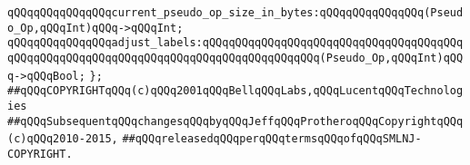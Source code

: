 \verb|qQQqqQQqqQQqqQQqcurrent_pseudo_op_size_in_bytes:qQQqqQQqqQQqqQQq(Pseudo_Op,qQQqInt)qQQq->qQQqInt;|\newline
\verb|qQQqqQQqqQQqqQQqadjust_labels:qQQqqQQqqQQqqQQqqQQqqQQqqQQqqQQqqQQqqQQqqQQqqQQqqQQqqQQqqQQqqQQqqQQqqQQqqQQqqQQqqQQqqQQq(Pseudo_Op,qQQqInt)qQQq->qQQqBool;|\newline
\verb|};|\newline
\newline
\newline
\newline
\newline
\newline
\newline
\newline
\newline
\newline
\verb|##qQQqCOPYRIGHTqQQq(c)qQQq2001qQQqBellqQQqLabs,qQQqLucentqQQqTechnologies|\newline
\verb|##qQQqSubsequentqQQqchangesqQQqbyqQQqJeffqQQqProtheroqQQqCopyrightqQQq(c)qQQq2010-2015,|\newline
\verb|##qQQqreleasedqQQqperqQQqtermsqQQqofqQQqSMLNJ-COPYRIGHT.|\newline

